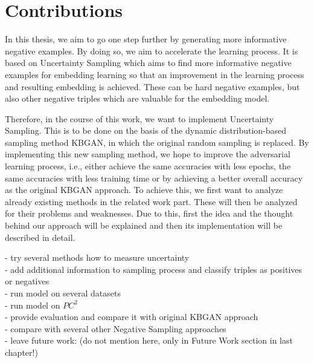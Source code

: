 \section{Contributions}

In this thesis, we aim to go one step further by generating more informative negative examples. 
By doing so, we aim to accelerate the learning process.
It is based on Uncertainty Sampling which aims to find more informative negative examples for embedding learning so that an improvement in the learning process and resulting embedding is achieved.
These can be hard negative examples, but also other negative triples which are valuable for the embedding model.

Therefore, in the course of this work, we want to implement Uncertainty Sampling.
This is to be done on the basis of the dynamic distribution-based sampling method KBGAN, in which the original random sampling is replaced.
By implementing this new sampling method, we hope to improve the adversarial learning process, i.e., either achieve the same accuracies with less epochs, the same accuracies with less training time or by achieving a better overall accuracy as the original KBGAN approach.
To achieve this, we first want to analyze already existing methods in the related work part.
These will then be analyzed for their problems and weaknesses.
Due to this, first the idea and the thought behind our approach will be explained and then its implementation will be described in detail.

- try several methods how to measure uncertainty\\
- add additional information to sampling process and classify triples as positives or negatives\\
- run model on several datasets\\
- run model on $PC^2$\\
- provide evaluation and compare it with original KBGAN approach\\
- compare with several other Negative Sampling approaches\\
- leave future work: (do not mention here, only in Future Work section in last chapter!)\\